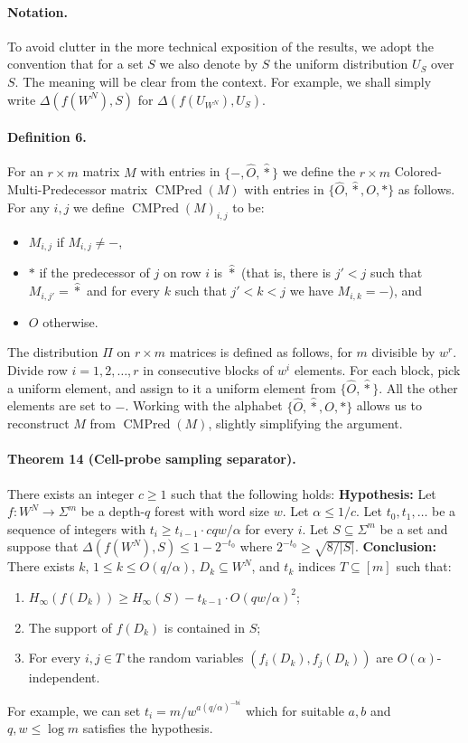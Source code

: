 \documentclass[10pt,a4paper]{article}
\begin{document}
\paragraph{Notation.}
To avoid clutter in the more technical exposition of the results, we adopt the convention that for a set $S$ we also denote by $S$ the uniform distribution $U_S$ over $S$. The meaning will be clear from the context. For example, we shall simply write $\Delta(f(W^N),S)$ for $\Delta(f(U_{W^N}),U_S)$.

\paragraph{Definition 6.}
For an $r\times m$ matrix $M$ with entries in $\{-,\widehat O,\widehat *\}$ we define the $r\times m$ Colored-Multi-Predecessor matrix $\operatorname{CMPred}(M)$ with entries in $\{\widehat O,\widehat *,O,*\}$ as follows. For any $i,j$ we define $\operatorname{CMPred}(M)_{i,j}$ to be:
\begin{itemize}
\item $M_{i,j}$ if $M_{i,j}\neq-$,
\item $*$ if the predecessor of $j$ on row $i$ is $\widehat *$ (that is, there is $j'<j$ such that $M_{i,j'}=\widehat *$ and for every $k$ such that $j'<k<j$ we have $M_{i,k}=-$), and
\item $O$ otherwise.
\end{itemize}
The distribution $\Pi$ on $r\times m$ matrices is defined as follows, for $m$ divisible by $w^r$. Divide row $i=1,2,\ldots,r$ in consecutive blocks of $w^i$ elements. For each block, pick a uniform element, and assign to it a uniform element from $\{\widehat O,\widehat *\}$. All the other elements are set to $-$.
Working with the alphabet $\{\widehat O,\widehat *,O,*\}$ allows us to reconstruct $M$ from $\operatorname{CMPred}(M)$, slightly simplifying the argument.

\paragraph{Theorem 14 (Cell-probe sampling separator).}
There exists an integer $c\geq1$ such that the following holds:
\textbf{Hypothesis:} Let $f:W^N\to\Sigma^m$ be a depth-$q$ forest with word size $w$. Let $\alpha\leq1/c$. Let $t_0,t_1,\ldots$ be a sequence of integers with $t_i\geq t_{i-1}\cdot cqw/\alpha$ for every $i$. Let $S\subseteq\Sigma^m$ be a set and suppose that $\Delta(f(W^N),S)\leq1-2^{-t_0}$ where $2^{-t_0}\geq\sqrt{8/|S|}$.
\textbf{Conclusion:} There exists $k$, $1\leq k\leq O(q/\alpha)$, $D_k\subseteq W^N$, and $t_k$ indices $T\subseteq[m]$ such that:
\begin{enumerate}
\item[(0)] $H_\infty(f(D_k))\geq H_\infty(S)-t_{k-1}\cdot O(qw/\alpha)^2$;
\item[(1)] The support of $f(D_k)$ is contained in $S$;
\item[(2)] For every $i,j\in T$ the random variables $(f_i(D_k),f_j(D_k))$ are $O(\alpha)$-independent.
\end{enumerate}
For example, we can set $t_i=m/w^{a(q/\alpha)^{-bi}}$ which for suitable $a,b$ and $q,w\leq\log m$ satisfies the hypothesis.
\end{document}
